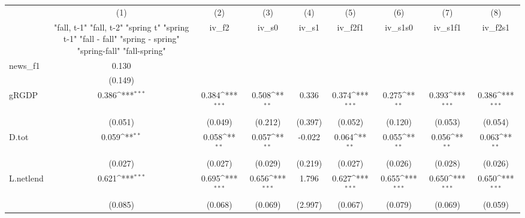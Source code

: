 {
\def\sym#1{\ifmmode^{#1}\else\(^{#1}\)\fi}
\begin{tabular}{l*{8}{c}}
\toprule
            &\multicolumn{1}{c}{(1)}&\multicolumn{1}{c}{(2)}&\multicolumn{1}{c}{(3)}&\multicolumn{1}{c}{(4)}&\multicolumn{1}{c}{(5)}&\multicolumn{1}{c}{(6)}&\multicolumn{1}{c}{(7)}&\multicolumn{1}{c}{(8)}\\
            &\multicolumn{1}{c}{  "fall, t-1" "fall, t-2" "spring t" "spring t-1"  "fall - fall" "spring - spring" "spring-fall" "fall-spring" }&\multicolumn{1}{c}{iv\_f2}&\multicolumn{1}{c}{iv\_s0}&\multicolumn{1}{c}{iv\_s1}&\multicolumn{1}{c}{iv\_f2f1}&\multicolumn{1}{c}{iv\_s1s0}&\multicolumn{1}{c}{iv\_s1f1}&\multicolumn{1}{c}{iv\_f2s1}\\
\midrule
news\_f1     &       0.130         &                     &                     &                     &                     &                     &                     &                     \\
            &     (0.149)         &                     &                     &                     &                     &                     &                     &                     \\
\addlinespace
gRGDP       &       0.386\sym{***}&       0.384\sym{***}&       0.508\sym{**} &       0.336         &       0.374\sym{***}&       0.275\sym{**} &       0.393\sym{***}&       0.386\sym{***}\\
            &     (0.051)         &     (0.049)         &     (0.212)         &     (0.397)         &     (0.052)         &     (0.120)         &     (0.053)         &     (0.054)         \\
\addlinespace
D.tot       &       0.059\sym{**} &       0.058\sym{**} &       0.057\sym{**} &      -0.022         &       0.064\sym{**} &       0.055\sym{**} &       0.056\sym{**} &       0.063\sym{**} \\
            &     (0.027)         &     (0.027)         &     (0.029)         &     (0.219)         &     (0.027)         &     (0.026)         &     (0.028)         &     (0.026)         \\
\addlinespace
L.netlend   &       0.621\sym{***}&       0.695\sym{***}&       0.656\sym{***}&       1.796         &       0.627\sym{***}&       0.655\sym{***}&       0.650\sym{***}&       0.650\sym{***}\\
            &     (0.085)         &     (0.068)         &     (0.069)         &     (2.997)         &     (0.067)         &     (0.079)         &     (0.069)         &     (0.059)         \\

\end{tabular}}
